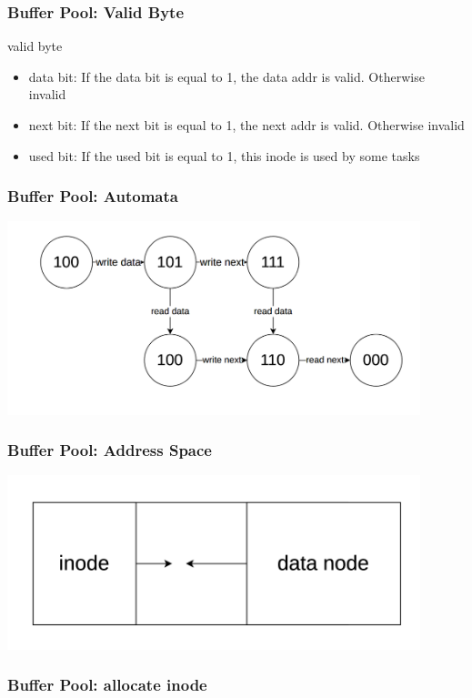 \documentclass[notheorems, aspectratio=54]{beamer}
\begin{document}
\begin{frame}
    \frametitle{Buffer Pool: Valid Byte}
    \begin{block} {valid byte}
        \begin{itemize}
            \item data bit: If the data bit is equal to 1, the data addr is valid. Otherwise invalid
            \item next bit: If the next bit is equal to 1, the next addr is valid. Otherwise invalid
            \item used bit: If the used bit is equal to 1, this inode is used by some tasks
        \end{itemize}
    \end{block}
\end{frame}

\begin{frame}
    \frametitle{Buffer Pool: Automata}
    \centering
    \includegraphics[width=12cm]{global_img_dir/automata.png}
\end{frame}

\begin{frame}
    \frametitle{Buffer Pool: Address Space}
    \centering
    \includegraphics[width=12cm]{global_img_dir/space.png}
\end{frame}

\begin{frame}
    \frametitle{Buffer Pool: allocate inode}
\end{frame}
\end{document}
